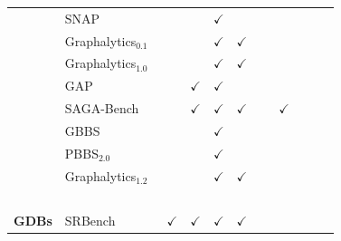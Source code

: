 \begin{landscape}
\begin{table}[htbp]
\begin{tabular}{ll|cccccccc}
               {\footnotesize ~              }  & {\footnotesize SNAP~\cite{Leskovec2016}                }      &               &              & $\checkmark$  &               &               &               &               &               \\
               {\footnotesize ~              }  & {\footnotesize Graphalytics$_{0.1}$~\cite{Capota2015}  }      &               &              & $\checkmark$  & $\checkmark$  &               &               &               &               \\
               {\footnotesize ~              }  & {\footnotesize Graphalytics$_{1.0}$~\cite{Iosup2016}   }      &               &              & $\checkmark$  & $\checkmark$  &               &               &               &               \\
               {\footnotesize ~              }  & {\footnotesize GAP~\cite{Beamer2017}                   }      &               & $\checkmark$ & $\checkmark$  &               &               &               &               &               \\
               {\footnotesize ~              }  & {\footnotesize SAGA-Bench~\cite{Basak2020}             }      &               & $\checkmark$ & $\checkmark$  & $\checkmark$  &               & $\checkmark$  &               &               \\
               {\footnotesize ~              }  & {\footnotesize GBBS~\cite{Dhulipala2020,Dhulipala2021} }      &               &              & $\checkmark$  &               &               &               &               &               \\
               {\footnotesize ~              }  & {\footnotesize PBBS$_{2.0}$~\cite{Anderson2022}        }      &               &              & $\checkmark$  &               &               &               &               &               \\
               {\footnotesize ~              }  & {\footnotesize Graphalytics$_{1.2}$~\cite{Iosup2023}   }      &               &              & $\checkmark$  & $\checkmark$  &               &               &               &               \\
               {\footnotesize ~              }  & {\footnotesize ~                                       }      &               &       ~      &       ~       &       ~       &       ~       &       ~       &       ~       &      ~        \\
               {\footnotesize \textbf{GDBs}  }  & {\footnotesize SRBench~\cite{Zhang2012}                }      & $\checkmark$  & $\checkmark$ & $\checkmark$  & $\checkmark$  &               &               &               &               \\

\end{tabular}
\end{table}
\end{landscape}
